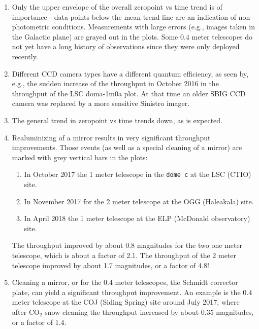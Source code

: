 \documentclass[]{spieman}
\begin{document}
\begin{enumerate}

\item Only the upper envelope of the overall zeropoint vs time trend is of importance - data points
below the mean trend line are an indication of non-photometric conditions. Measurements with large
errors (e.g., images taken in the Galactic plane) are grayed out in the plots. Some 0.4 meter 
telescopes do not yet have a long history of observations since they were only deployed recently.

\item Different CCD camera types have a different quantum efficiency, as seen by, e.g., the sudden
increase of the throughput in October 2016 in the throughput of the LSC doma-1m0a plot. At that time
an older SBIG CCD camera was replaced by a more sensitive Sinistro imager.

\item The general trend in zeropoint vs time trends down, as is expected.

\item Realuminizing of a mirror results in very significant throughput improvements. Those events 
(as well as a special cleaning of a mirror) are marked with grey vertical bars in the plots:
 \begin{enumerate}
 	\item In October 2017 the 1 meter telescope in the {\tt dome c} at the LSC (CTIO) site.
    \item In November 2017 for the 2 meter telescope at the OGG (Haleakala) site. 
    \item In April 2018 the 1 meter telescope at the ELP  (McDonald observatory) site.
\end{enumerate}
 The throughput improved by about 0.8 magnitudes for the two one meter telescope, which is about a 
 factor of 2.1. The throughput of the 2 meter telescope improved by about 1.7 magnitudes, or a 
 factor of 4.8!

\item Cleaning a mirror, or for the 0.4 meter telescopes, the Schmidt corrector plate, can yield
a significant throughput improvement. An example is the 0.4 meter telescope at the COJ (Siding 
Spring) site around July 2017, where after CO$_2$ snow cleaning the throughput increased by about 
0.35 magnitudes, or a factor of 1.4. 


\end{enumerate}
\end{document}
